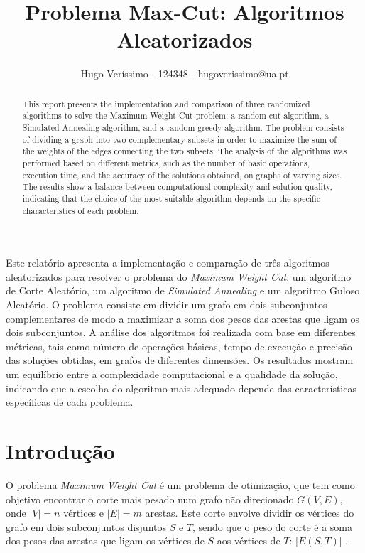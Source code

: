 \documentclass[mirror, portugues]{revdetua}
\begin{document}

\title{Problema Max-Cut: Algoritmos Aleatorizados}
\author{Hugo Veríssimo - 124348 - hugoverissimo@ua.pt}
\maketitle

\begin{abstract}
This report presents the implementation and comparison of three randomized algorithms to solve the Maximum Weight Cut problem: a random cut algorithm, a Simulated Annealing algorithm, and a random greedy algorithm. The problem consists of dividing a graph into two complementary subsets in order to maximize the sum of the weights of the edges connecting the two subsets. The analysis of the algorithms was performed based on different metrics, such as the number of basic operations, execution time, and the accuracy of the solutions obtained, on graphs of varying sizes. The results show a balance between computational complexity and solution quality, indicating that the choice of the most suitable algorithm depends on the specific characteristics of each problem.
\end{abstract}

\begin{resumo}
Este relatório apresenta a implementação e comparação de três algoritmos aleatorizados para resolver o problema do \textit{Maximum Weight Cut}: um algoritmo de Corte Aleatório, um algoritmo de \textit{Simulated Annealing} e um algoritmo Guloso Aleatório. O problema consiste em dividir um grafo em dois subconjuntos complementares de modo a maximizar a soma dos pesos das arestas que ligam os dois subconjuntos. A análise dos algoritmos foi realizada com base em diferentes métricas, tais como número de operações básicas, tempo de execução e precisão das soluções obtidas, em grafos de diferentes dimensões. Os resultados mostram um equilíbrio entre a complexidade computacional e a qualidade da solução, indicando que a escolha do algoritmo mais adequado depende das características específicas de cada problema.
\end{resumo}


\section{Introdução}

O problema \textit{Maximum Weight Cut} é um problema de otimização, que tem como objetivo encontrar o corte mais pesado num grafo não direcionado $G(V,E)$, onde $|V| = n$ vértices e $|E| = m$ arestas. Este corte envolve dividir os vértices do grafo em dois subconjuntos disjuntos $S$ e $T$, sendo que o peso do corte é a soma dos pesos das arestas que ligam os vértices de $S$ aos vértices de $T$: $|E(S, T)|$ \cite{AG14}.
\end{document}
